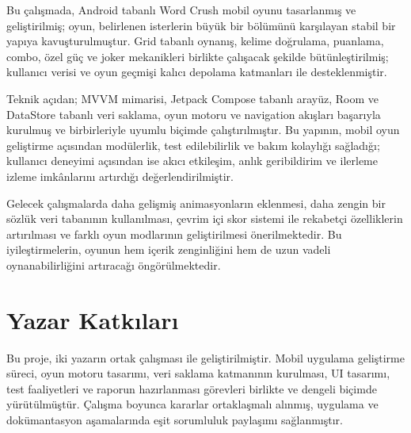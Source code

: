 \documentclass[conference]{IEEEtran}
\begin{document}
Bu çalışmada, Android tabanlı Word Crush mobil oyunu tasarlanmış ve
geliştirilmiş; oyun, belirlenen isterlerin büyük bir bölümünü karşılayan
stabil bir yapıya kavuşturulmuştur. Grid tabanlı oynanış, kelime
doğrulama, puanlama, combo, özel güç ve joker mekanikleri birlikte
çalışacak şekilde bütünleştirilmiş; kullanıcı verisi ve oyun geçmişi
kalıcı depolama katmanları ile desteklenmiştir.

Teknik açıdan; MVVM mimarisi, Jetpack Compose tabanlı arayüz, Room ve
DataStore tabanlı veri saklama, oyun motoru ve navigation akışları
başarıyla kurulmuş ve birbirleriyle uyumlu biçimde çalıştırılmıştır.
Bu yapının, mobil oyun geliştirme açısından modülerlik, test edilebilirlik
ve bakım kolaylığı sağladığı; kullanıcı deneyimi açısından ise
akıcı etkileşim, anlık geribildirim ve ilerleme izleme imkânlarını
artırdığı değerlendirilmiştir.

Gelecek çalışmalarda daha gelişmiş animasyonların eklenmesi, daha zengin
bir sözlük veri tabanının kullanılması, çevrim içi skor sistemi ile
rekabetçi özelliklerin artırılması ve farklı oyun modlarının
geliştirilmesi önerilmektedir. Bu iyileştirmelerin, oyunun hem
içerik zenginliğini hem de uzun vadeli oynanabilirliğini
artıracağı öngörülmektedir.

\vspace{1cm}

\section{Yazar Katkıları}

Bu proje, iki yazarın ortak çalışması ile geliştirilmiştir. Mobil
uygulama geliştirme süreci, oyun motoru tasarımı, veri saklama
katmanının kurulması, UI tasarımı, test faaliyetleri ve raporun
hazırlanması görevleri birlikte ve dengeli biçimde yürütülmüştür.
Çalışma boyunca kararlar ortaklaşmalı alınmış, uygulama ve dokümantasyon
aşamalarında eşit sorumluluk paylaşımı sağlanmıştır.

\vspace{1cm}
\end{document}
